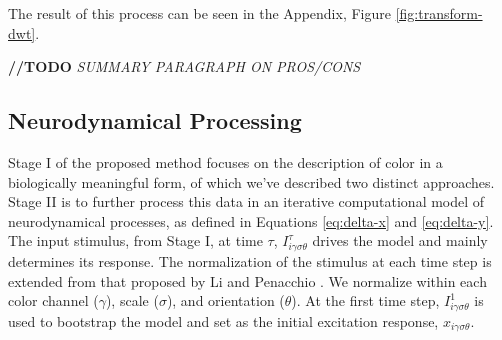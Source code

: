 \documentclass[journal,onecolumn]{IEEEtran}
\begin{document}
The result of this process can be seen in the Appendix, Figure \ref{fig:transform-dwt}.

\bigskip
\textbf{//TODO} \textit{SUMMARY PARAGRAPH ON PROS/CONS}
\bigskip


\subsection*{Neurodynamical Processing}

Stage I of the proposed method focuses on the description of color in a biologically meaningful form, of which we've described two distinct approaches. Stage II is to further process this data in an iterative computational model of neurodynamical processes, as defined in Equations \ref{eq:delta-x} and \ref{eq:delta-y}. The input stimulus, from Stage I, at time $\tau$, $I^\tau_{i\gamma\sigma\theta}$ drives the model and mainly determines its response. The normalization of the stimulus at each time step is extended from that proposed by Li \cite{li:1999} and Penacchio \cite{penacchio:2013}. We normalize within each color channel ($\gamma$), scale ($\sigma$), and orientation ($\theta$). At the first time step, $I^1_{i\gamma\sigma\theta}$ is used to bootstrap the model and set as the initial excitation response, $x_{i\gamma\sigma\theta}$.
\end{document}
